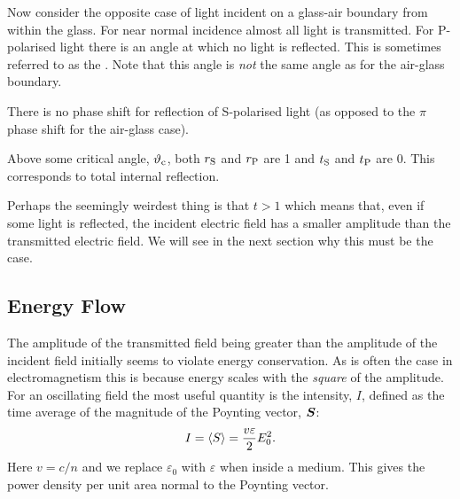     Now consider the opposite case of light incident on a glass-air boundary from within the glass.
    For near normal incidence almost all light is transmitted.
    For P-polarised light there is an angle at which no light is reflected.
    This is sometimes referred to as the .
    Note that this angle is \emph{not} the same angle as for the air-glass boundary.
    
    There is no phase shift for reflection of S-polarised light (as opposed to the \(\pi\) phase shift for the air-glass case).
    
    Above some critical angle, \(\vartheta_{\mathrm{c}}\), both \({r}_{\mathrm{{S}}}\) and \({r}_{\mathrm{{P}}}\) are 1 and \({t}_{\mathrm{{S}}}\) and \({t}_{\mathrm{{P}}}\) are 0.
    This corresponds to total internal reflection.
    
    Perhaps the seemingly weirdest thing is that \(t > 1\) which means that, even if some light is reflected, the incident electric field has a smaller amplitude than the transmitted electric field.
    We will see in the next section why this must be the case.
    
    \subsection{Energy Flow}
    The amplitude of the transmitted field being greater than the amplitude of the incident field initially seems to violate energy conservation.
    As is often the case in electromagnetism this is because energy scales with the \emph{square} of the amplitude.
    For an oscillating field the most useful quantity is the intensity, \(I\), defined as the time average of the magnitude of the Poynting vector, \(\bm{S}\):
    \[I = \langle{S}\rangle = \frac{v\varepsilon}{2}E_0^2.\]
    Here \(v = c/n\) and we replace \(\varepsilon_0\) with \(\varepsilon\) when inside a medium.
    This gives the power density per unit area normal to the Poynting vector.
    
